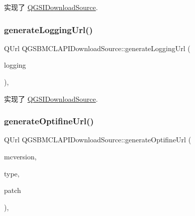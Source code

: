 实现了 \mbox{\hyperlink{class_q_g_s_i_download_source_a276656b21753de8384d457def7c23701}{Q\+G\+S\+I\+Download\+Source}}.

\mbox{\label{class_q_g_s_b_m_c_l_a_p_i_download_source_ab33a32509621c2c0d2fef055bcf4cfd5}} 
\subsubsection{\texorpdfstring{generate\+Logging\+Url()}{generateLoggingUrl()}}
{\footnotesize\ttfamily Q\+Url Q\+G\+S\+B\+M\+C\+L\+A\+P\+I\+Download\+Source\+::generate\+Logging\+Url (\begin{DoxyParamCaption}\item[{const \mbox{\hyperlink{class_q_g_s_logging}{Q\+G\+S\+Logging}} \&}]{logging }\end{DoxyParamCaption})\hspace{0.3cm}{\ttfamily [override]}, {\ttfamily [virtual]}}



实现了 \mbox{\hyperlink{class_q_g_s_i_download_source_aae93e5aba009f01df11cbbc6aacac96f}{Q\+G\+S\+I\+Download\+Source}}.

\mbox{\label{class_q_g_s_b_m_c_l_a_p_i_download_source_a652a1fccb17bbb957f526d1a5dc03532}} 
\subsubsection{\texorpdfstring{generate\+Optifine\+Url()}{generateOptifineUrl()}}
{\footnotesize\ttfamily Q\+Url Q\+G\+S\+B\+M\+C\+L\+A\+P\+I\+Download\+Source\+::generate\+Optifine\+Url (\begin{DoxyParamCaption}\item[{const Q\+String \&}]{mcversion,  }\item[{const Q\+String \&}]{type,  }\item[{const Q\+String \&}]{patch }\end{DoxyParamCaption})\hspace{0.3cm}{\ttfamily [override]}, {\ttfamily [virtual]}}



